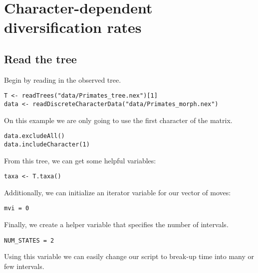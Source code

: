 

\bigskip
\section{Character-dependent diversification rates}\label{sec:CDBDP}


\subsection{Read the tree}

Begin by reading in the observed tree. 

{\tt \begin{snugshade*}
\begin{lstlisting}
T <- readTrees("data/Primates_tree.nex")[1]
data <- readDiscreteCharacterData("data/Primates_morph.nex")
\end{lstlisting}
\end{snugshade*}}
On this example we are only going to use the first character of the matrix.
{\tt \begin{snugshade*}
\begin{lstlisting}
data.excludeAll()
data.includeCharacter(1)
\end{lstlisting}
\end{snugshade*}}

From this tree, we can get some helpful variables:
{\tt \begin{snugshade*}
\begin{lstlisting}
taxa <- T.taxa()
\end{lstlisting}
\end{snugshade*}}

Additionally, we can initialize an iterator variable for our vector of moves:
{\tt \begin{snugshade*}
\begin{lstlisting}
mvi = 0
\end{lstlisting}
\end{snugshade*}}

Finally, we create a helper variable that specifies the number of intervals.
{\tt \begin{snugshade*}
\begin{lstlisting}
NUM_STATES = 2
\end{lstlisting}
\end{snugshade*}}
Using this variable we can easily change our script to break-up time into many or few intervals.



